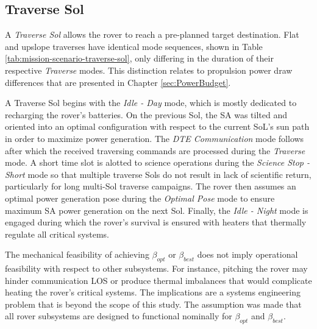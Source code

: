 \subsection{Traverse Sol}
\label{sec:ReferenceSols:TraverseSol}
A \textit{Traverse Sol} allows the rover to reach a pre-planned target destination. Flat and upslope traverses have identical mode sequences, shown in Table \ref{tab:mission-scenario-traverse-sol}, only differing in the duration of their respective \textit{Traverse} modes. This distinction relates to propulsion power draw differences that are presented in Chapter \ref{sec:PowerBudget}.



A Traverse Sol begins with the \textit{Idle - Day} mode, which is mostly dedicated to recharging the rover's batteries. On the previous Sol, the \ac{SA} was tilted and oriented into an optimal configuration with respect to the current SoL's sun path in order to maximize power generation. The \textit{\ac{DTE} Communication} mode follows after which the received traversing commands are processed during the \textit{Traverse} mode. A short time slot is alotted to science operations during the \textit{Science Stop - Short} mode so that multiple traverse Sols do not result in lack of scientific return, particularly for long multi-Sol traverse campaigns. The rover then assumes an optimal power generation pose during the \textit{Optimal Pose} mode to ensure maximum \ac{SA} power generation on the next Sol. Finally, the \textit{Idle - Night} mode is engaged during which the rover's survival is ensured with heaters that thermally regulate all critical systems.

The mechanical feasibility of achieving $\beta_{opt}$ or $\beta_{best}$ does not imply operational feasibility with respect to other subsystems. For instance, pitching the rover may hinder communication \ac{LOS} or produce thermal imbalances that would complicate heating the rover's critical systems. The implications are a systems engineering problem that is beyond the scope of this study. The assumption was made that all rover subsystems are designed to functional nominally for $\beta_{opt}$ and $\beta_{best}$.

%

